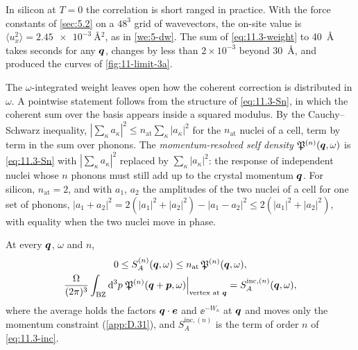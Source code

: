 In silicon at $T = 0$ the correlation is short ranged in practice. With the force constants of \cref{sec:5.2} on a $48^3$ grid of wavevectors, the on-site value is $\langle u_x^2\rangle = \SI{2.45e-3}{\angstrom^2}$, as in \cref{we:5-dw}. The sum of \cref{eq:11.3-weight} to \SI{40}{\angstrom} takes seconds for any $\bm{q}$, changes by less than $2\times10^{-3}$ beyond \SI{30}{\angstrom}, and produced the curves of \cref{fig:11-limit-3a}.

The $\omega$-integrated weight leaves open how the coherent correction is distributed in $\omega$. A pointwise statement follows from the structure of \cref{eq:11.3-Sn}, in which the coherent sum over the basis appears inside a squared modulus. By the Cauchy--Schwarz inequality, $|\sum_\kappa a_\kappa|^2 \le n_{\mathrm{at}}\sum_\kappa|a_\kappa|^2$ for the $n_{\mathrm{at}}$ nuclei of a cell, term by term in the sum over phonons. The \emph{momentum-resolved self density} $\mathfrak{P}^{(n)}(\bm{q},\omega)$ is \cref{eq:11.3-Sn} with $|\sum_\kappa a_\kappa|^2$ replaced by $\sum_\kappa|a_\kappa|^2$: the response of independent nuclei whose $n$ phonons must still add up to the crystal momentum $\bm{q}$. For silicon, $n_{\mathrm{at}} = 2$, and with $a_1$, $a_2$ the amplitudes of the two nuclei of a cell for one set of phonons, $|a_1 + a_2|^2 = 2(|a_1|^2 + |a_2|^2) - |a_1 - a_2|^2 \le 2(|a_1|^2 + |a_2|^2)$, with equality when the two nuclei move in phase.
\begin{keyresult}
At every $\bm{q}$, $\omega$ and $n$,
\begin{equation}
  \begin{gathered}
  0 \le S^{(n)}_A(\bm{q},\omega) \le n_{\mathrm{at}}\,\mathfrak{P}^{(n)}(\bm{q},\omega) , \\
  \frac{\Omega}{(2\pi)^3}\int_{\mathrm{BZ}}\mathrm{d}^3p\;\mathfrak{P}^{(n)}(\bm{q} + \bm{p},\omega)\Big|_{\text{vertex at }\bm{q}} = S^{\mathrm{inc},(n)}_A(\bm{q},\omega) ,
  \end{gathered}
  \label{eq:11.3-band}
\end{equation}
where the average holds the factors $\bm{q}\cdot\bm{e}$ and $\ee^{-W_\kappa}$ at $\bm{q}$ and moves only the momentum constraint (\cref{app:D.31}), and $S^{\mathrm{inc},(n)}_A$ is the term of order $n$ of \cref{eq:11.3-inc}.
\end{keyresult}
